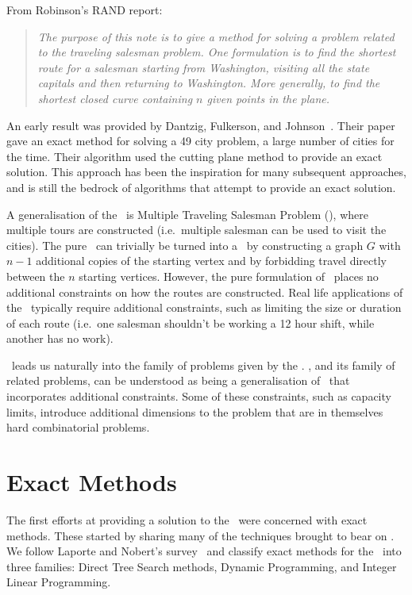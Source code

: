 From Robinson's RAND report:
\begin{quote}
\itshape
   The purpose of this note is to give a method for solving a problem related to the traveling salesman problem. One formulation is to find the shortest route for a salesman starting from Washington, visiting all the state capitals and then returning to Washington. More generally, to find the shortest closed curve containing $n$ given points in the plane.
\end{quote}

An early result was provided by Dantzig, Fulkerson, and  Johnson~\cite{Dantzig:1954}. Their paper gave an exact method for solving a 49 city problem, a large number of cities for the time. Their algorithm used the cutting plane method to provide an exact solution. This approach has been the inspiration for many subsequent approaches, and is still the bedrock of algorithms that attempt to provide an exact solution.  

A generalisation of the \TSP\ is Multiple Traveling Salesman Problem (\MTSP), where multiple tours are constructed (i.e.~multiple salesman can be used to visit the cities). The pure \MTSP\ can trivially be turned into a \TSP\ by constructing a graph $G$ with $n - 1$ additional copies of the starting vertex and by forbidding travel directly between the $n$ starting vertices. However, the pure formulation of \MTSP\ places no additional constraints on how the routes are constructed. Real life applications of the \MTSP\ typically require additional constraints, such as limiting the size or duration of each route (i.e.~one salesman shouldn't be working a 12 hour shift, while another has no work).

\MTSP\ leads us naturally into the family of problems given by the \VRP. \VRP, and its family of related problems, can be understood as being a generalisation of \MTSP\ that incorporates additional constraints. Some of these constraints, such as capacity limits, introduce additional dimensions to the problem that are in themselves hard combinatorial problems.

\section{Exact Methods}
\label{sec:em}

The first efforts at providing a solution to the \VRP\ were concerned with exact methods. These started by sharing many of the techniques brought to bear on \TSP. We follow Laporte and Nobert's survey~\cite{LANO:87} and classify exact methods for the \VRP\ into three families: Direct Tree Search methods, Dynamic Programming, and Integer Linear Programming.

